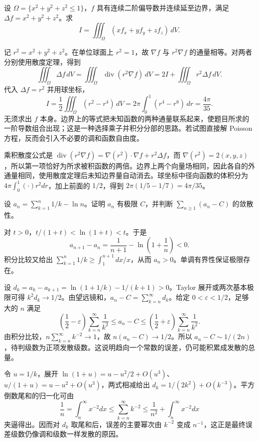 \documentclass[UTF8,12pt,a4paper,fontset=fandol]{ctexart}
\begin{document}
\begin{example}\label{nm-final8-4}
设 $\Omega=\{x^2+y^2+z^2\leq1\}$，$f$ 具有连续二阶偏导数并连续延至边界，满足 $\Delta f=x^2+y^2+z^2$。求
\[
 I=\iiint_\Omega(xf_x+yf_y+zf_z)\,dV.
\]
\end{example}
\begin{solve}
记 $r^2=x^2+y^2+z^2$。在单位球面上 $r^2=1$，故 $\nabla f$ 与 $r^2\nabla f$ 的通量相等。对两者分别使用散度定理，得到
\[
 \iiint_\Omega\Delta f\,dV
 =\iiint_\Omega\operatorname{div}(r^2\nabla f)\,dV
 =2I+\iiint_\Omega r^2\Delta f\,dV.
\]
代入 $\Delta f=r^2$ 并用球坐标，
\[
 I=\frac12\iiint_\Omega(r^2-r^4)\,dV
 =2\pi\int_0^1(r^4-r^6)\,dr
 =\frac{4\pi}{35}.
\]
无须求出 $f$ 本身。边界上的等式把未知函数的两种通量联系起来，使题目所求的一阶导数组合出现；这是一种选择乘子并积分分部的思路。若试图直接解 Poisson 方程，反而会引入不必要的调和函数自由度。

乘积散度公式是 $\operatorname{div}(r^2\nabla f)=\nabla(r^2)\cdot\nabla f+r^2\Delta f$，而 $\nabla(r^2)=2(x,y,z)$，所以第一项恰好为所求被积函数的两倍。边界上两个向量场相同，因此各自的外通量相同，使用散度定理后未知边界量自动消去。球坐标中径向函数的体积分为 $4\pi\int_0^1(\cdot)r^2dr$，加上前面的 $1/2$，得到 $2\pi(1/5-1/7)=4\pi/35$。

\end{solve}

\begin{example}\label{nm-final8-6}
设 $a_n=\sum_{k=1}^n1/k-\ln n$。证明 $a_n$ 有极限 $C$，并判断 $\sum_{n\geq1}(a_n-C)$ 的敛散性。
\end{example}
\begin{solve}
对 $t>0$，$t/(1+t)<\ln(1+t)<t$。于是
\[
 a_{n+1}-a_n=\frac1{n+1}-\ln\left(1+\frac1n\right)<0.
\]
积分比较又给出 $\sum_{k=1}^n1/k\geq\int_1^{n+1}dx/x$，从而 $a_n>0$。单调有界性保证极限存在。

设 $d_k=a_k-a_{k+1}=\ln(1+1/k)-1/(k+1)>0$。Taylor 展开或两次基本极限可得 $k^2d_k\to1/2$。由望远镜和，$a_n-C=\sum_{k=n}^\infty d_k$。给定 $0<\varepsilon<1/2$，足够大的 $n$ 满足
\[
 \left(\frac12-\varepsilon\right)\sum_{k=n}^\infty\frac1{k^2}
 \leq a_n-C\leq
 \left(\frac12+\varepsilon\right)\sum_{k=n}^\infty\frac1{k^2}.
\]
由积分比较，$n\sum_{k=n}^\infty k^{-2}\to1$，故 $n(a_n-C)\to1/2$。所以 $a_n-C\sim1/(2n)$，待判级数为正项发散级数。这说明趋向一个常数的误差，仍可能积累成发散的总量。

令 $u=1/k$，展开 $\ln(1+u)=u-u^2/2+O(u^3)$、$u/(1+u)=u-u^2+O(u^3)$，两式相减给出 $d_k=1/(2k^2)+O(k^{-3})$。平方倒数尾和的归一化可由
\[
\frac1n=\int_n^\infty x^{-2}dx\le\sum_{k=n}^\infty k^{-2}
\le\frac1{n^2}+\int_n^\infty x^{-2}dx
\]
夹逼得出。因而对 $d_k$ 取尾和后，误差的主要幂次由 $k^{-2}$ 变成 $n^{-1}$，这正是最终误差级数仍像调和级数一样发散的原因。

\end{solve}
\end{document}
